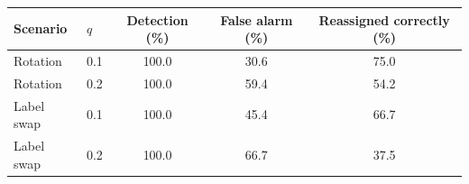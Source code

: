 \scriptsize
\setlength{\tabcolsep}{4pt}
\begin{tabular}{llccc}
\toprule
Scenario & $q$ & Detection (\%) & False alarm (\%) & Reassigned correctly (\%) \\
\midrule
Rotation & 0.1 & 100.0 & 30.6 & 75.0 \\
Rotation & 0.2 & 100.0 & 59.4 & 54.2 \\
\midrule
Label swap & 0.1 & 100.0 & 45.4 & 66.7 \\
Label swap & 0.2 & 100.0 & 66.7 & 37.5 \\
\bottomrule
\end{tabular}
